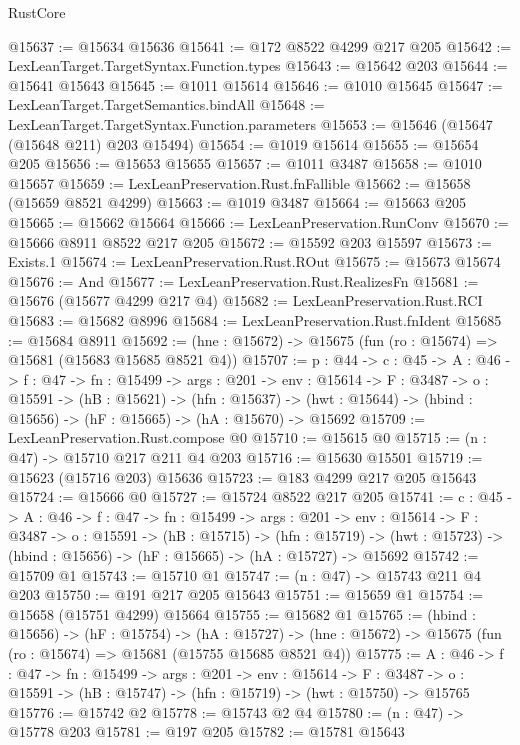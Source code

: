 \begin{lexlean}{RustCore}
\begin{coremodule}
@15637 := @15634 @15636
@15641 := @172 @8522 @4299 @217 @205
@15642 := LexLeanTarget.TargetSyntax.Function.types
@15643 := @15642 @203
@15644 := @15641 @15643
@15645 := @1011 @15614
@15646 := @1010 @15645
@15647 := LexLeanTarget.TargetSemantics.bindAll
@15648 := LexLeanTarget.TargetSyntax.Function.parameters
@15653 := @15646 (@15647 (@15648 @211) @203 @15494)
@15654 := @1019 @15614
@15655 := @15654 @205
@15656 := @15653 @15655
@15657 := @1011 @3487
@15658 := @1010 @15657
@15659 := LexLeanPreservation.Rust.fnFallible
@15662 := @15658 (@15659 @8521 @4299)
@15663 := @1019 @3487
@15664 := @15663 @205
@15665 := @15662 @15664
@15666 := LexLeanPreservation.RunConv
@15670 := @15666 @8911 @8522 @217 @205
@15672 := @15592 @203 @15597
@15673 := Exists.{1}
@15674 := LexLeanPreservation.Rust.ROut
@15675 := @15673 @15674
@15676 := And
@15677 := LexLeanPreservation.Rust.RealizesFn
@15681 := @15676 (@15677 @4299 @217 @4)
@15682 := LexLeanPreservation.Rust.RCI
@15683 := @15682 @8996
@15684 := LexLeanPreservation.Rust.fnIdent
@15685 := @15684 @8911
@15692 := (hne : @15672) -> @15675 (fun (ro : @15674) => @15681 (@15683 @15685 @8521 @4))
@15707 := {p : @44} ->
  {c : @45} ->
  {A : @46} ->
  {f : @47} ->
  {fn : @15499} ->
  {args : @201} ->
  {env : @15614} ->
  {F : @3487} ->
  {o : @15591} ->
  (hB : @15621) ->
  (hfn : @15637) -> (hwt : @15644) -> (hbind : @15656) -> (hF : @15665) -> (hA : @15670) -> @15692
@15709 := LexLeanPreservation.Rust.compose @0
@15710 := @15615 @0
@15715 := (n : @47) -> @15710 @217 @211 @4 @203
@15716 := @15630 @15501
@15719 := @15623 (@15716 @203) @15636
@15723 := @183 @4299 @217 @205 @15643
@15724 := @15666 @0
@15727 := @15724 @8522 @217 @205
@15741 := {c : @45} ->
  {A : @46} ->
  {f : @47} ->
  {fn : @15499} ->
  {args : @201} ->
  {env : @15614} ->
  {F : @3487} ->
  {o : @15591} ->
  (hB : @15715) ->
  (hfn : @15719) -> (hwt : @15723) -> (hbind : @15656) -> (hF : @15665) -> (hA : @15727) -> @15692
@15742 := @15709 @1
@15743 := @15710 @1
@15747 := (n : @47) -> @15743 @211 @4 @203
@15750 := @191 @217 @205 @15643
@15751 := @15659 @1
@15754 := @15658 (@15751 @4299) @15664
@15755 := @15682 @1
@15765 := (hbind : @15656) ->
  (hF : @15754) ->
  (hA : @15727) -> (hne : @15672) -> @15675 (fun (ro : @15674) => @15681 (@15755 @15685 @8521 @4))
@15775 := {A : @46} ->
  {f : @47} ->
  {fn : @15499} ->
  {args : @201} ->
  {env : @15614} ->
  {F : @3487} -> {o : @15591} -> (hB : @15747) -> (hfn : @15719) -> (hwt : @15750) -> @15765
@15776 := @15742 @2
@15778 := @15743 @2 @4
@15780 := (n : @47) -> @15778 @203
@15781 := @197 @205
@15782 := @15781 @15643

\end{coremodule}
\end{lexlean}
